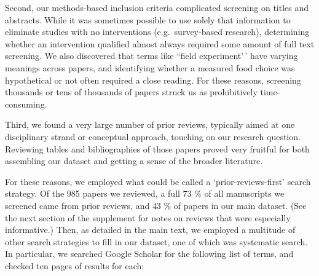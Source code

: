 \documentclass[sn-nature,referee,pdflatex]{sn-jnl}
\begin{document}
Second, our methods-based inclusion criteria complicated screening on
titles and abstracts. While it was sometimes possible to use solely that
information to eliminate studies with no interventions
(e.g.~survey-based research), determining whether an intervention
qualified almost always required some amount of full text screening. We
also discovered that terms like ``field experiment'\,' have varying
meanings across papers, and identifying whether a measured food choice
was hypothetical or not often required a close reading. For these
reasons, screening thousands or tens of thousands of papers struck us as
prohibitively time-consuming.

Third, we found a very large number of prior reviews, typically aimed at
one disciplinary strand or conceptual approach, touching on our research
question. Reviewing tables and bibliographies of those papers proved
very fruitful for both assembling our dataset and getting a sense of the
broader literature.

For these reasons, we employed what could be called a
`prior-reviews-first' search strategy. Of the 985 papers we reviewed, a
full 73 \% of all manuscripts we screened came from prior reviews, and
43 \% of papers in our main dataset. (See the next section of the
supplement for notes on reviews that were especially informative.) Then,
as detailed in the main text, we employed a multitude of other search
strategies to fill in our dataset, one of which was systematic search.
In particular, we searched Google Scholar for the following list of
terms, and checked ten pages of results for each:
\end{document}
